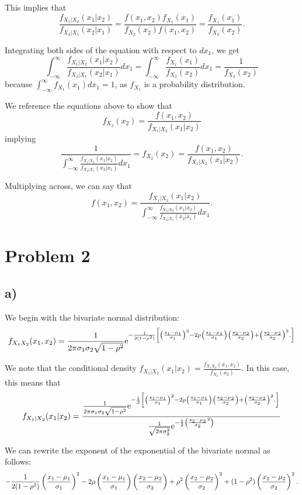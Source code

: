 \documentclass[]{article}
\begin{document}
This implies that \[
\frac{f_{X_1|X_2}(x_1|x_2)}{f_{X_2|X_1}(x_2|x_1)} = \frac{f(x_1, x_2)f_{X_1}(x_1)}{f_{X_2}(x_2)f(x_1, x_2)} = \frac{f_{X_1}(x_1)}{f_{X_2}(x_2)}.
\]

Integrating both sides of the equation with respect to \(dx_1\), we get
\[
\int_{-\infty}^{\infty}\frac{f_{X_1|X_2}(x_1|x_2)}{f_{X_2|X_1}(x_2|x_1)} dx_1 = \int_{-\infty}^{\infty} \frac{f_{X_1}(x_1)}{f_{X_2}(x_2)}dx_1 = \frac{1}{f_{X_2}(x_2)}
\] because \(\int_{-\infty}^{\infty} f_{X_1}(x_1)dx_1 = 1\), as
\(f_{X_1}\) is a probability distribution.

We reference the equations above to show that \[
f_{X_2}(x_2) = \frac{f(x_1, x_2)}{f_{X_1 | X_2}(x_1 | x_2)}
\] implying \[
\frac{1}{\int_{-\infty}^{\infty}\frac{f_{X_1|X_2}(x_1|x_2)}{f_{X_2|X_1}(x_2|x_1)} dx_1} = 
f_{X_2}(x_2) = \frac{f(x_1, x_2)}{f_{X_1 | X_2}(x_1 | x_2)}.
\]

Multiplying across, we can say that \[
f(x_1, x_2) = \frac{f_{X_1 | X_2}(x_1 | x_2)}{\int_{-\infty}^{\infty}\frac{f_{X_1|X_2}(x_1|x_2)}{f_{X_2|X_1}(x_2|x_1)} dx_1}.
\]

\section{Problem 2}\label{problem-2}

\subsection{a)}\label{a-1}

We begin with the bivariate normal distribution: \[
f_{X_1X_2}(x_1, x_2) = \frac{1}{2 \pi \sigma_1 \sigma_2 \sqrt{1 - \rho^2}} 
\rm{e}^{-\frac{1}{2(1 - \rho^2)}\left[\left(\frac{x_1 - \mu_1}{\sigma_1}\right)^2 -2 \rho \left(\frac{x_1-\mu_1}{\sigma_1} \right) 
\left(\frac{x_2 - \mu_2}{\sigma_2}\right) + \left(\frac{x_2-\mu_2}{\sigma_2}\right)^2.
\right]}
\]

We note that the conditional density
\(f_{X_1|X_2}(x_1 | x_2) = \frac{f_{X_1 X_2}(x_1, x_2)}{f_{X_2}(x_2)}\).
In this case, this means that \[
f_{X_1|X_2}(x_1 | x_2) =
\frac{\frac{1}{2 \pi \sigma_1 \sigma_2 \sqrt{1 - \rho^2}} 
\rm{e}^{-\frac{1}{2}\left[\left(\frac{x_1 - \mu_1}{\sigma_1}\right)^2 -2 \rho \left(\frac{x_1-\mu_1}{\sigma_1} \right) 
\left(\frac{x_2 - \mu_2}{\sigma_2}\right) + \left(\frac{x_2-\mu_2}{\sigma_2}\right)^2.
\right]}}
{\frac{1}{\sqrt{2\pi\sigma_2^2}} \rm{e}^{-\frac{1}{2}\left(\frac{x_2 - \mu_2}{\sigma_2}^2 \right)}}
\]

We can rewrite the exponent of the exponential of the bivariate normal
as follows: \[
-\frac{1}{2(1-\rho^2)}\left(\frac{x_{1} - \mu_{1}}{\sigma_{1}} \right)^2 - 2 \rho\left(\frac{x_{1} - \mu_{1}}{\sigma_{1}} \right)\left(\frac{x_{2} - \mu_{2}}{\sigma_{2}} \right) + \rho^2\left(\frac{x_{2} - \mu_{2}}{\sigma_{2}} \right)^2 + (1 - \rho^2)\left(\frac{x_{2} - \mu_{2}}{\sigma_{2}} \right)^2.
\]
\end{document}
